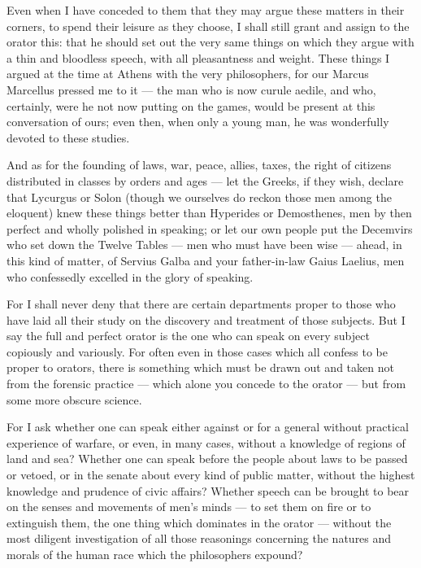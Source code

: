  Even when I have conceded to them that they may argue these matters in their corners, to spend their leisure as they choose, I shall still grant and assign to the orator this: that he should set out the very same things on which they argue with a thin and bloodless speech, with all pleasantness and weight. These things I argued at the time at Athens with the very philosophers, for our Marcus Marcellus pressed me to it — the man who is now curule aedile, and who, certainly, were he not now putting on the games, would be present at this conversation of ours; even then, when only a young man, he was wonderfully devoted to these studies.

 And as for the founding of laws, war, peace, allies, taxes, the right of citizens distributed in classes by orders and ages — let the Greeks, if they wish, declare that Lycurgus or Solon (though we ourselves do reckon those men among the eloquent) knew these things better than Hyperides or Demosthenes, men by then perfect and wholly polished in speaking; or let our own people put the Decemvirs who set down the Twelve Tables — men who must have been wise — ahead, in this kind of matter, of Servius Galba and your father-in-law Gaius Laelius, men who confessedly excelled in the glory of speaking.

 For I shall never deny that there are certain departments proper to those who have laid all their study on the discovery and treatment of those subjects. But I say the full and perfect orator is the one who can speak on every subject copiously and variously. For often even in those cases which all confess to be proper to orators, there is something which must be drawn out and taken not from the forensic practice — which alone you concede to the orator — but from some more obscure science.

 For I ask whether one can speak either against or for a general without practical experience of warfare, or even, in many cases, without a knowledge of regions of land and sea? Whether one can speak before the people about laws to be passed or vetoed, or in the senate about every kind of public matter, without the highest knowledge and prudence of civic affairs? Whether speech can be brought to bear on the senses and movements of men's minds — to set them on fire or to extinguish them, the one thing which dominates in the orator — without the most diligent investigation of all those reasonings concerning the natures and morals of the human race which the philosophers expound?

